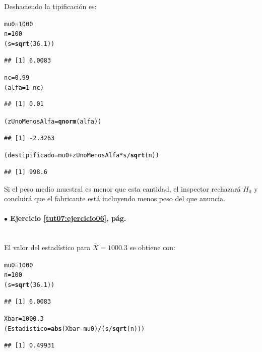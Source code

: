 \documentclass[10pt,a4paper]{article}\usepackage[]{graphicx}\usepackage[]{color}
\makeatletter
\newcommand{\hlnum}[1]{\textcolor[rgb]{0.686,0.059,0.569}{#1}}%
\newcommand{\hlopt}[1]{\textcolor[rgb]{0,0,0}{#1}}%
\newcommand{\hlstd}[1]{\textcolor[rgb]{0.345,0.345,0.345}{#1}}%
\newcommand{\hlkwb}[1]{\textcolor[rgb]{0.69,0.353,0.396}{#1}}%
\newcommand{\hlkwd}[1]{\textcolor[rgb]{0.737,0.353,0.396}{\textbf{#1}}}%
\newenvironment{kframe}{%
 \def\at@end@of@kframe{}%
 \ifinner\ifhmode%
  \def\at@end@of@kframe{\end{minipage}}%
  \begin{minipage}{\columnwidth}%
 \fi\fi%
 \def\FrameCommand##1{\hskip\@totalleftmargin \hskip-\fboxsep
 \colorbox{shadecolor}{##1}\hskip-\fboxsep
     \hskip-\linewidth \hskip-\@totalleftmargin \hskip\columnwidth}%
 \MakeFramed {\advance\hsize-\width
   \@totalleftmargin\z@ \linewidth\hsize
   \@setminipage}}%
 {\par\unskip\endMakeFramed%
 \at@end@of@kframe}
\newenvironment{knitrout}{}{} %
\makeatother
\begin{document}
Deshaciendo la tipificación es:
\begin{knitrout}
\color{fgcolor}\begin{kframe}
\begin{alltt}
\hlstd{mu0} \hlkwb{=} \hlnum{1000}
\hlstd{n} \hlkwb{=} \hlnum{100}
\hlstd{(s} \hlkwb{=} \hlkwd{sqrt}\hlstd{(}\hlnum{36.1}\hlstd{))}
\end{alltt}
\begin{verbatim}
## [1] 6.0083
\end{verbatim}
\begin{alltt}
\hlstd{nc} \hlkwb{=} \hlnum{0.99}
\hlstd{(alfa} \hlkwb{=} \hlnum{1} \hlopt{-} \hlstd{nc)}
\end{alltt}
\begin{verbatim}
## [1] 0.01
\end{verbatim}
\begin{alltt}
\hlstd{(zUnoMenosAlfa} \hlkwb{=} \hlkwd{qnorm}\hlstd{(alfa))}
\end{alltt}
\begin{verbatim}
## [1] -2.3263
\end{verbatim}
\begin{alltt}
\hlstd{(destipificado} \hlkwb{=} \hlstd{mu0} \hlopt{+} \hlstd{zUnoMenosAlfa} \hlopt{*} \hlstd{s} \hlopt{/} \hlkwd{sqrt}\hlstd{(n))}
\end{alltt}
\begin{verbatim}
## [1] 998.6
\end{verbatim}
\end{kframe}
\end{knitrout}
Si el peso medio muestral es menor que esta cantidad, el inspector rechazará $H_0$ y concluirá que el fabricante está incluyendo menos peso del que anuncia.

\paragraph{\bf $\bullet$ Ejercicio \ref{tut07:ejercicio06}, pág. \pageref{tut07:ejercicio06}}
\label{tut07:ejercicio06:sol}\quad\\

El valor del estadístico para $\bar X=1000.3$ se obtiene con:
\begin{knitrout}
\color{fgcolor}\begin{kframe}
\begin{alltt}
\hlstd{mu0} \hlkwb{=} \hlnum{1000}
\hlstd{n} \hlkwb{=} \hlnum{100}
\hlstd{(s} \hlkwb{=} \hlkwd{sqrt}\hlstd{(}\hlnum{36.1}\hlstd{))}
\end{alltt}
\begin{verbatim}
## [1] 6.0083
\end{verbatim}
\begin{alltt}
\hlstd{Xbar} \hlkwb{=} \hlnum{1000.3}
\hlstd{(Estadistico} \hlkwb{=} \hlkwd{abs}\hlstd{(Xbar} \hlopt{-} \hlstd{mu0)} \hlopt{/} \hlstd{(s} \hlopt{/} \hlkwd{sqrt}\hlstd{(n)))}
\end{alltt}
\begin{verbatim}
## [1] 0.49931
\end{verbatim}
\end{kframe}
\end{knitrout}
\end{document}
